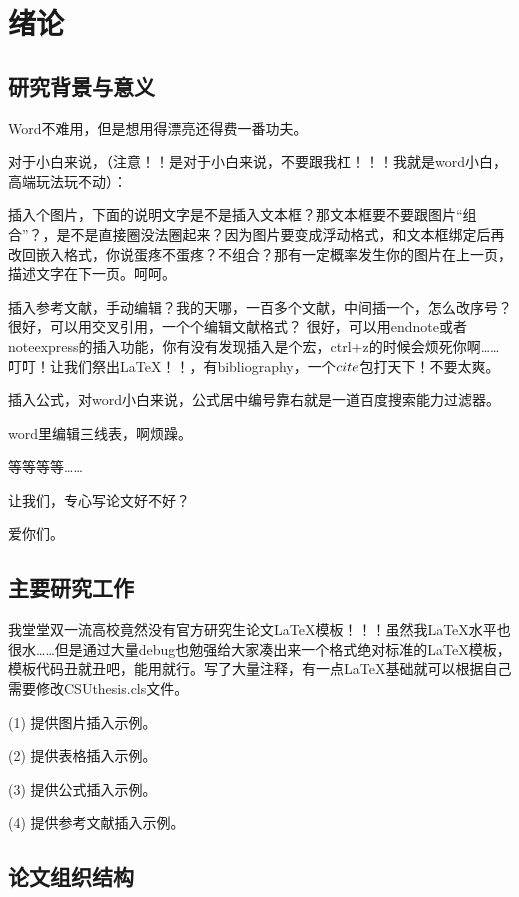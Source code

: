 \section{绪论}
\subsection{研究背景与意义}

Word不难用，但是想用得漂亮还得费一番功夫。

对于小白来说，（注意！！是对于小白来说，不要跟我杠！！！我就是word小白，高端玩法玩不动）：

插入个图片，下面的说明文字是不是插入文本框？那文本框要不要跟图片“组合”？，是不是直接圈没法圈起来？因为图片要变成浮动格式，和文本框绑定后再改回嵌入格式，你说蛋疼不蛋疼？不组合？那有一定概率发生你的图片在上一页，描述文字在下一页。呵呵。

插入参考文献，手动编辑？我的天哪，一百多个文献，中间插一个，怎么改序号？
很好，可以用交叉引用，一个个编辑文献格式？
很好，可以用endnote或者noteexpress的插入功能，你有没有发现插入是个宏，ctrl+z的时候会烦死你啊……
叮叮！让我们祭出LaTeX！！，有bibliography，一个$\\cite$包打天下！不要太爽。

插入公式，对word小白来说，公式居中编号靠右就是一道百度搜索能力过滤器。

word里编辑三线表，啊烦躁。

等等等等……

让我们，专心写论文好不好？

爱你们。


\subsection{主要研究工作}
我堂堂双一流高校竟然没有官方研究生论文LaTeX模板！！！虽然我LaTeX水平也很水……但是通过大量debug也勉强给大家凑出来一个格式绝对标准的LaTeX模板，模板代码丑就丑吧，能用就行。写了大量注释，有一点LaTeX基础就可以根据自己需要修改CSUthesis.cls文件。

(1) 提供图片插入示例。

(2) 提供表格插入示例。

(3) 提供公式插入示例。

(4) 提供参考文献插入示例。

\subsection{论文组织结构}

